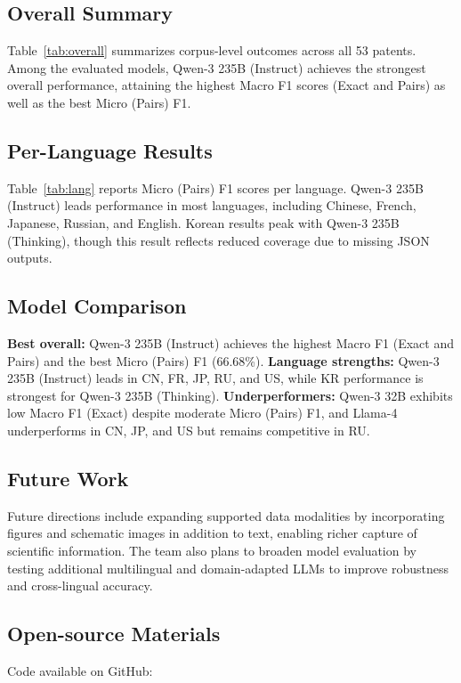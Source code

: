 \subsection*{Overall Summary}
Table~\ref{tab:overall} summarizes corpus-level outcomes across all 53 patents. Among the evaluated models, Qwen-3 235B (Instruct) achieves the strongest overall performance, attaining the highest Macro F1 scores (Exact and Pairs) as well as the best Micro (Pairs) F1.

\subsection*{Per-Language Results}
Table~\ref{tab:lang} reports Micro (Pairs) F1 scores per language. Qwen-3 235B (Instruct) leads performance in most languages, including Chinese, French, Japanese, Russian, and English. Korean results peak with Qwen-3 235B (Thinking), though this result reflects reduced coverage due to missing JSON outputs.

\subsection*{Model Comparison}
\textbf{Best overall:} Qwen-3 235B (Instruct) achieves the highest Macro F1 (Exact and Pairs) and the best Micro (Pairs) F1 (66.68\%).  
\textbf{Language strengths:} Qwen-3 235B (Instruct) leads in CN, FR, JP, RU, and US, while KR performance is strongest for Qwen-3 235B (Thinking).  
\textbf{Underperformers:} Qwen-3 32B exhibits low Macro F1 (Exact) despite moderate Micro (Pairs) F1, and Llama-4 underperforms in CN, JP, and US but remains competitive in RU.

\subsection*{Future Work}
Future directions include expanding supported data modalities by incorporating figures and schematic images in addition to text, enabling richer capture of scientific information. The team also plans to broaden model evaluation by testing additional multilingual and domain-adapted LLMs to improve robustness and cross-lingual accuracy.

\subsection*{Open-source Materials}
Code available on GitHub: 

